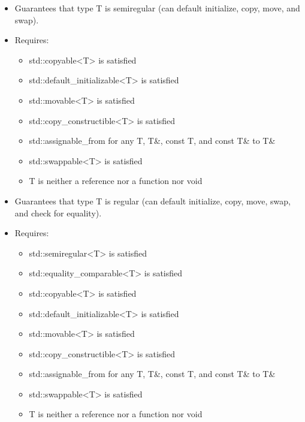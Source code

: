 
\begin{itemize}
\item
Guarantees that type T is semiregular (can default initialize, copy, move, and swap).

\item
Requires:
\begin{itemize}
\item
std::copyable<T> is satisfied

\item
std::default\_initializable<T> is satisfied

\item
std::movable<T> is satisfied

\item
std::copy\_constructible<T> is satisfied

\item
std::assignable\_from for any T, T\&, const T, and const T\& to T\&

\item
std::swappable<T> is satisfied

\item
T is neither a reference nor a function nor void
\end{itemize}
\end{itemize}


\begin{itemize}
\item
Guarantees that type T is regular (can default initialize, copy, move, swap, and check for equality).

\item
Requires:
\begin{itemize}
\item
std::semiregular<T> is satisfied

\item
std::equality\_comparable<T> is satisfied

\item
std::copyable<T> is satisfied

\item
std::default\_initializable<T> is satisfied

\item
std::movable<T> is satisfied

\item
std::copy\_constructible<T> is satisfied

\item
std::assignable\_from for any T, T\&, const T, and const T\& to T\&

\item
std::swappable<T> is satisfied

\item
T is neither a reference nor a function nor void
\end{itemize}
\end{itemize}


